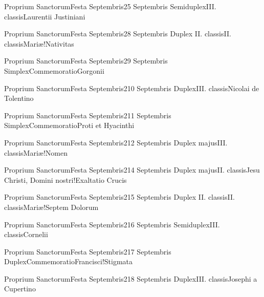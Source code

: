 \documentclass[invitatoriale-romanum.tex]{subfiles}
\begin{document}
	{Proprium Sanctorum}{Festa Septembris}{2}{5 Septembris}
	{Semiduplex}{III. classis}{Laurentii Justiniani}
	{}
	{}

	{Proprium Sanctorum}{Festa Septembris}{2}{8 Septembris}
	{Duplex II. classis}{II. classis}{Mariæ!Nativitas}
	{}
	{}

	{Proprium Sanctorum}{Festa Septembris}{2}{9 Septembris}
	{Simplex}{Commemoratio}{Gorgonii}
	{}
	{\invitferia}

	{Proprium Sanctorum}{Festa Septembris}{2}{10 Septembris}
	{Duplex}{III. classis}{Nicolai de Tolentino}
	{}
	{}

	{Proprium Sanctorum}{Festa Septembris}{2}{11 Septembris}
	{Simplex}{Commemoratio}{Proti et Hyacinthi}
	{}
	{\invitferia}

	{Proprium Sanctorum}{Festa Septembris}{2}{12 Septembris}
	{Duplex majus}{III. classis}{Mariæ!Nomen}
	{}
	{}

	{Proprium Sanctorum}{Festa Septembris}{2}{14 Septembris}
	{Duplex majus}{II. classis}{Jesu Christi, Domini nostri!Exaltatio Crucis}
	{}
	{}

	{Proprium Sanctorum}{Festa Septembris}{2}{15 Septembris}
	{Duplex II. classis}{II. classis}{Mariæ!Septem Dolorum}
	{}
	{}

	{Proprium Sanctorum}{Festa Septembris}{2}{16 Septembris}
	{Semiduplex}{III. classis}{Cornelii}
	{}
	{}

	{Proprium Sanctorum}{Festa Septembris}{2}{17 Septembris}
	{Duplex}{Commemoratio}{Francisci!Stigmata}
	{}
	{\invitferia}

	{Proprium Sanctorum}{Festa Septembris}{2}{18 Septembris}
	{Duplex}{III. classis}{Josephi a Cupertino}
	{}
	{}
\end{document}
